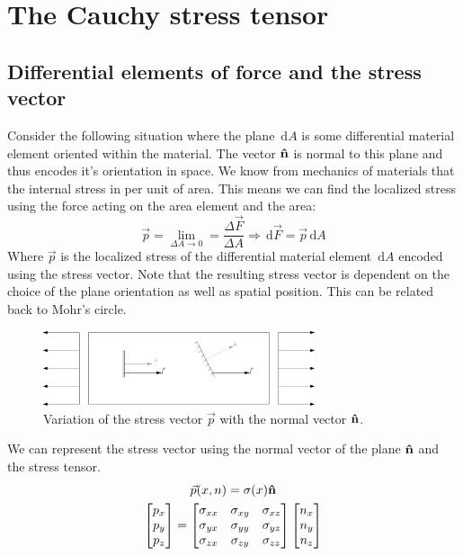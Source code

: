 \documentclass[11pt, a4paper]{article}
\renewcommand*{\d}{\,\text{d}}
\DeclareRobustCommand{\uvec}[1]{{%
  \ifcat\relax\noexpand#1%
    \bm{\hat{#1}}%
  \else
    \ifcsname uvec#1\endcsname
      \csname uvec#1\endcsname
    \else
      \bm{\hat{\mathbf{#1}}}%
     \fi
   \fi
}}
\numberwithin{equation}{section}
\numberwithin{figure}{section}
\begin{document}
\setcounter{section}{2}

\section{The Cauchy stress tensor}
\subsection{Differential elements of force and the stress vector}
Consider the following situation where the plane $\d A$ is some differential material element oriented within the material. The vector $\uvec{n}$ is normal to this plane and thus encodes it's orientation in space. We know from mechanics of materials that the internal stress in per unit of area. This means we can find the localized stress using the force acting on the area element and the area:
\begin{equation}
  \vec{p} = \lim_{\Delta A \to 0} = \frac{\Delta \vec{F}}{\Delta A} \Rightarrow \d \vec{F} = \vec{p}\d A
\end{equation}
Where $\vec{p}$ is the localized stress of the differential material element $\d A$ encoded using the stress vector. Note that the resulting stress vector is dependent on the choice of the plane orientation as well as spatial position. This can be related back to Mohr's circle.
\begin{figure}[H]
  \centerline{\includegraphics[width=80mm]{images/stress_element.png}}
  \caption{Variation of the stress vector $\vec{p}$ with the normal vector $\uvec{n}$.}
\end{figure}
We can represent the stress vector using the normal vector of the plane $\uvec{n}$ and the stress tensor.
\begin{gather}
  \vec{p}(x, n) = \mathbf{\sigma}(x) \uvec{n}\\
  \begin{bmatrix}
    p_x \\
    p_y \\
    p_z
  \end{bmatrix}
  =
  \begin{bmatrix}
    \sigma_{xx} & \sigma_{xy} & \sigma_{xz} \\
    \sigma_{yx} & \sigma_{yy} & \sigma_{yz} \\
    \sigma_{zx} & \sigma_{zy} & \sigma_{zz} \\
  \end{bmatrix}
  \begin{bmatrix}
    n_x \\
    n_y \\
    n_z
  \end{bmatrix}
\end{gather}
\end{document}
